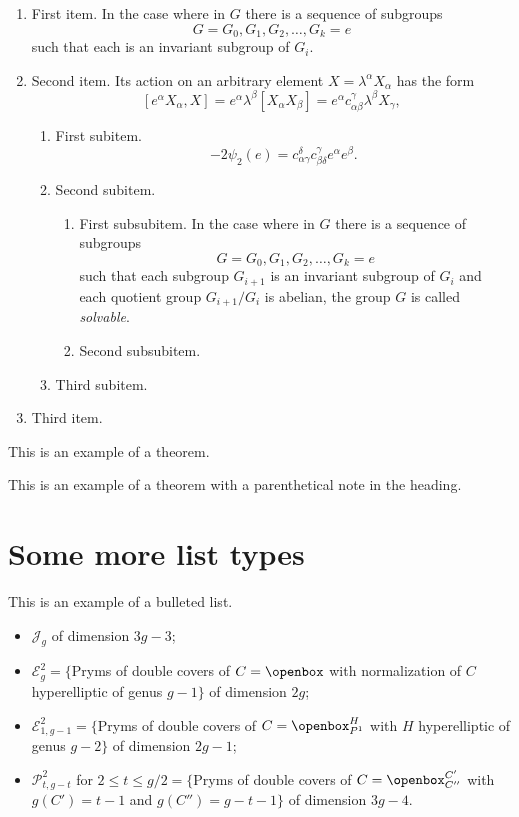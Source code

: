 \begin{enumerate}
\item First item.
In the case where in $G$ there is a sequence of subgroups
\[
G = G_0, G_1, G_2, \dots, G_k = e
\]
such that each is an invariant subgroup of $G_i$.

\item Second item.
Its action on an arbitrary element $X = \lambda^\alpha X_\alpha$ has the
form
\begin{equation}\label{eq:action}
[e^\alpha X_\alpha, X] = e^\alpha \lambda^\beta
[X_\alpha X_\beta] = e^\alpha c^\gamma_{\alpha \beta}
 \lambda^\beta X_\gamma,
\end{equation}

\begin{enumerate}
\item First subitem.
\[
- 2\psi_2(e) =  c_{\alpha \gamma}^\delta c_{\beta \delta}^\gamma
e^\alpha e^\beta.
\]

\item Second subitem.
\begin{enumerate}
\item First subsubitem.
In the case where in $G$ there is a sequence of subgroups
\[
G = G_0, G_1, G_2, \ldots, G_k = e
\]
such that each subgroup $G_{i+1}$ is an invariant subgroup of $G_i$ and
each quotient group $G_{i+1}/G_{i}$ is abelian, the group $G$ is called
\textit{solvable}.

\item Second subsubitem.
\end{enumerate}
\item Third subitem.
\end{enumerate}
\item Third item.
\end{enumerate}

\begin{theorem}
This is an example of a theorem.
\end{theorem}

\begin{theorem}
This is an example of a theorem with a parenthetical note in the
heading.
\end{theorem}

\section{Some more list types}
This is an example of a bulleted list.

\begin{itemize}
\item $\mathcal{J}_g$ of dimension $3g-3$;
\item $\mathcal{E}^2_g=\{$Pryms of double covers of $C=\openbox$ with
normalization of $C$ hyperelliptic of genus $g-1\}$ of dimension $2g$;
\item $\mathcal{E}^2_{1,g-1}=\{$Pryms of double covers of
$C=\openbox^H_{P^1}$ with $H$ hyperelliptic of genus $g-2\}$ of
dimension $2g-1$;
\item $\mathcal{P}^2_{t,g-t}$ for $2\le t\le g/2=\{$Pryms of double
covers of $C=\openbox^{C'}_{C''}$ with $g(C')=t-1$ and $g(C'')=g-t-1\}$
of dimension $3g-4$.
\end{itemize}

